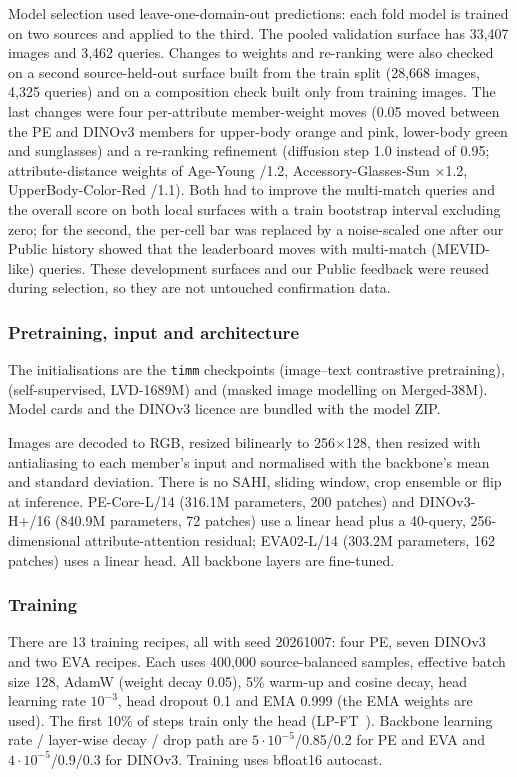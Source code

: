 \documentclass[a4paper, 10pt, conference]{ieeeconf}
\begin{document}
Model selection used leave-one-domain-out predictions: each fold model is trained on two sources and applied to the third. The pooled validation surface has 33{,}407 images and 3{,}462 queries. Changes to weights and re-ranking were also checked on a second source-held-out surface built from the train split (28{,}668 images, 4{,}325 queries) and on a composition check built only from training images. The last changes were four per-attribute member-weight moves (0.05 moved between the PE and DINOv3 members for upper-body orange and pink, lower-body green and sunglasses) and a re-ranking refinement (diffusion step 1.0 instead of 0.95; attribute-distance weights of Age-Young /1.2, Accessory-Glasses-Sun $\times$1.2, UpperBody-Color-Red /1.1). Both had to improve the multi-match queries and the overall score on both local surfaces with a train bootstrap interval excluding zero; for the second, the per-cell bar was replaced by a noise-scaled one after our Public history showed that the leaderboard moves with multi-match (MEVID-like) queries. These development surfaces and our Public feedback were reused during selection, so they are not untouched confirmation data.

\subsubsection{Pretraining, input and architecture}
The initialisations are the \texttt{timm} checkpoints  (image--text contrastive pretraining),  (self-supervised, LVD-1689M) and  (masked image modelling on Merged-38M). Model cards and the DINOv3 licence are bundled with the model ZIP.

Images are decoded to RGB, resized bilinearly to 256$\times$128, then resized with antialiasing to each member's input and normalised with the backbone's mean and standard deviation. There is no SAHI, sliding window, crop ensemble or flip at inference. PE-Core-L/14 (316.1M parameters, 200 patches) and DINOv3-H+/16 (840.9M parameters, 72 patches) use a linear head plus a 40-query, 256-dimensional attribute-attention residual; EVA02-L/14 (303.2M parameters, 162 patches) uses a linear head. All backbone layers are fine-tuned.

\subsubsection{Training}
There are 13 training recipes, all with seed 20261007: four PE, seven DINOv3 and two EVA recipes. Each uses 400{,}000 source-balanced samples, effective batch size 128, AdamW (weight decay 0.05), 5\% warm-up and cosine decay, head learning rate $10^{-3}$, head dropout 0.1 and EMA 0.999 (the EMA weights are used). The first 10\% of steps train only the head (LP-FT~\cite{Kumar:2022}). Backbone learning rate / layer-wise decay / drop path are $5\cdot10^{-5}$/0.85/0.2 for PE and EVA and $4\cdot10^{-5}$/0.9/0.3 for DINOv3. Training uses bfloat16 autocast.
\end{document}
